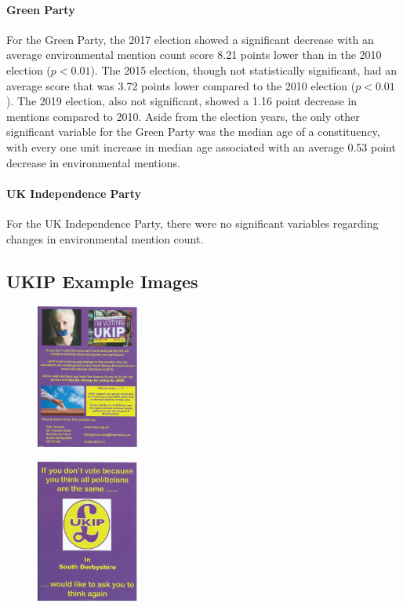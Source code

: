 \documentclass[12pt,letterpaper]{article}
\begin{document}
\paragraph{Green Party}

For the Green Party, the 2017 election showed a significant decrease with an average environmental mention count score 8.21 points lower than in the 2010 election ($p<0.01$). The 2015 election, though not statistically significant, had an average score that was 3.72 points lower compared to the 2010 election ($p<0.01$). The 2019 election, also not significant, showed a 1.16 point decrease in mentions compared to 2010. Aside from the election years, the only other significant variable for the Green Party was the median age of a constituency, with every one unit increase in median age associated with an average 0.53 point decrease in environmental mentions.

\paragraph{UK Independence Party}

For the UK Independence Party, there were no significant variables regarding changes in environmental mention count.


\subsection{UKIP Example Images}


\begin{figure}[H]
	\centering
	\includegraphics[width=0.3\textwidth]{28_1.jpg}
	\caption{}
	\label{fig:28_1}
\end{figure}

\begin{figure}[H]
	\centering
	\includegraphics[width=0.3\textwidth]{28_2.jpg}
	\caption{}
	\label{fig:28_2}
\end{figure}
\end{document}
